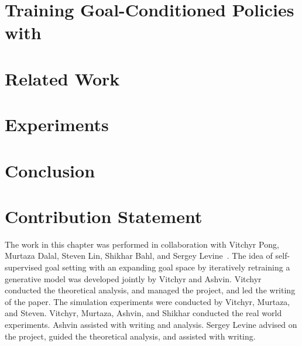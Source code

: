 \documentclass{article} %
\begin{document}
\section{Training Goal-Conditioned Policies with \METHOD}
\label{sec:train-policy}


\section{Related Work}\label{sec:related_work}


\section{Experiments}\label{sec:experiments}


\section{Conclusion}\label{sec:conclusion}


\section{Contribution Statement}

The work in this chapter was performed in collaboration with Vitchyr Pong, Murtaza Dalal, Steven Lin, Shikhar Bahl, and Sergey Levine~\cite{pong2019skewfit}. The idea of self-supervised goal setting with an expanding goal space by iteratively retraining a generative model was developed jointly by Vitchyr and Ashvin. Vitchyr conducted the theoretical analysis, and managed the project, and led the writing of the paper. The simulation experiments were conducted by Vitchyr, Murtaza, and Steven. Vitchyr, Murtaza, Ashvin, and Shikhar conducted the real world experiments. Ashvin assisted with writing and analysis. Sergey Levine advised on the project, guided the theoretical analysis, and assisted with writing.

{\small


}

\clearpage
\newpage

\end{document}
